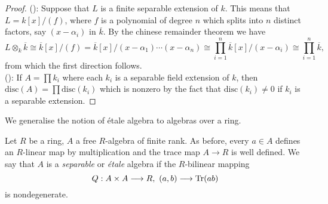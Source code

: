 \begin{proof}
	():
	Suppose that $L$ is a finite separable extension of $k$. This means that $L = k[x]/(f)$, where $f$ is a polynomial of degree $n$ which splits into $n$ distinct factors, say $(x-\alpha_i)$ in $\overline{k}$. By the chinese remainder theorem we have
	\[L \otimes_k \overline{k} \cong \overline{k}[x]/(f) = \overline{k}[x]/(x-\alpha_1)\cdots(x-\alpha_n) \cong \prod_{i=1}^n \overline{k}[x] / (x-\alpha_i) \cong \prod_{i=1}^n \overline{k},\] from which the first direction follows.\\
	():
	If $A = \prod k_i$ where each $k_i$ is a separable field extension of $k$, then $\text{disc}(A) = \prod \text{disc}(k_i)$ which is nonzero by the fact that $\text{disc}(k_i) \neq 0$ if $k_i$ is a separable extension.
\end{proof}

We generalise the notion of \'etale algebra to algebras over a ring.

\begin{definition}
	Let $R$ be a ring, $A$ a free $R$-algebra of finite rank. As before, every $a \in A$ defines an $R$-linear map by multiplication and the trace map $A \to R$ is well defined. We say that $A$ is a \textit{separable} or \textit{\'etale} algebra if the $R$-bilinear mapping
	\[
		Q : A \times A \longrightarrow R,\ (a,b) \longrightarrow \operatorname{Tr}(ab)
	\]
	is nondegenerate.
\end{definition}
